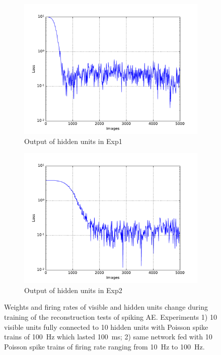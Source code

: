 \begin{figure}
\begin{subfigure}[t]{0.4\textwidth}
		\includegraphics[width=\textwidth]{pics_sdlm/05_exp_SAE_teach_long/exp1_mse_nons.pdf}
		\caption{Output of hidden units in Exp1}
	\end{subfigure}
	\begin{subfigure}[t]{0.4\textwidth}
		\includegraphics[width=\textwidth]{pics_sdlm/05_exp_SAE_teach_long/exp2_mse_nons.pdf}
		\caption{Output of hidden units in Exp2}
	\end{subfigure}
	\caption{Weights and firing rates of visible and hidden units change during training of the reconstruction tests of spiking AE. 
		Experiments 1) 10 visible units fully connected to 10 hidden units with Poisson spike trains of 100~Hz which lasted 100~ms; 2) same network fed with 10 Poisson spike trains of firing rate ranging from 10~Hz to 100~Hz.}
\end{figure}

